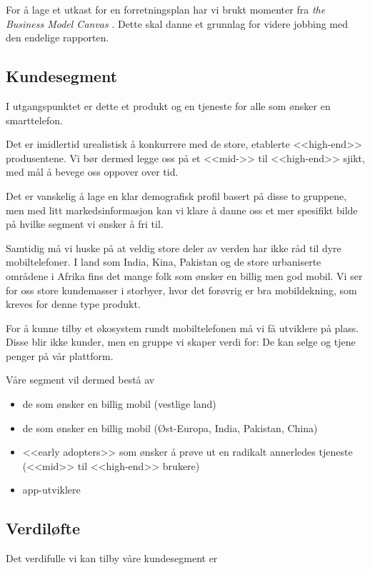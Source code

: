 For å lage et utkast for en forretningsplan har vi brukt momenter fra
\textit{the Business Model Canvas} \cite{osterwalder}. Dette skal danne et
grunnlag for videre jobbing med den endelige rapporten.

\subsection{Kundesegment}

I utgangspunktet er dette et produkt og en tjeneste for alle som ønsker en
smarttelefon.

Det er imidlertid urealistisk å konkurrere med de store, etablerte <<high-end>>
produsentene.  Vi bør dermed legge oss på et <<mid->> til <<high-end>> sjikt,
med mål å bevege oss oppover over tid.

Det er vanskelig å lage en klar demografisk profil basert på disse to
gruppene, men med litt markedsinformasjon kan vi klare å danne oss et mer
spesifikt bilde på hvilke segment vi ønsker å fri til.

Samtidig må vi huske på at veldig store deler av verden har ikke råd til dyre
mobiltelefoner. I land som India, Kina, Pakistan og de store urbaniserte
områdene i Afrika fins det mange folk som ønsker en billig men god mobil. Vi
ser for oss store kundemasser i storbyer, hvor det forøvrig er bra
mobildekning, som kreves for denne type produkt.

For å kunne tilby et økosystem rundt mobiltelefonen må vi få utviklere på
plass. Disse blir ikke kunder, men en gruppe vi skaper verdi for: De kan selge
og tjene penger på vår plattform.

Våre segment vil dermed bestå av

\begin{itemize}
  \item de som ønsker en billig mobil (vestlige land)
  \item de som ønsker en billig mobil (Øst-Europa, India, Pakistan, China)
  \item <<early adopters>> som ønsker å prøve ut en radikalt annerledes
    tjeneste (<<mid>> til <<high-end>> brukere)
  \item app-utviklere
\end{itemize}

\subsection{Verdiløfte}

Det verdifulle vi kan tilby våre kundesegment er

